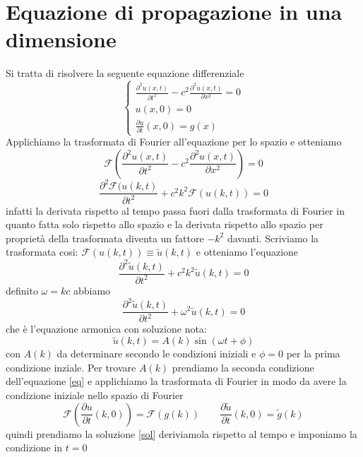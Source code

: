 \documentclass[12pt]{article}
\begin{document}
\newcommand{\R}{\mathbb{R}}
\newcommand{\C}{\mathbb{C}}
\newcommand{\Sum}{\sum_{n=0}^\infty}
\newtheorem{prop}{Proposizione}
\newtheorem{thm}{Teorema}[section]
\newtheorem{lem}[thm]{Lemma}
\theoremstyle{definition}
\newtheorem{dfn}{Definizione}
\theoremstyle{remark}
\newtheorem*{rmk}{Remark}
\renewcommand{\d}[2]{\frac{d #1}{d #2}} %
\newcommand{\dd}[2]{\frac{d^2 #1}{d #2^2}} %
\newcommand{\pd}[2]{\frac{\partial #1}{\partial #2}} 
\newcommand{\pdd}[2]{\frac{\partial^2 #1}{\partial #2^2}} 
\section{Equazione di propagazione in una dimensione}
Si tratta di risolvere la seguente equazione differenziale
\begin{equation}
\label{eq}
\begin{cases}
    \pdd{u(x,t)}{t}-c^2\pdd{u(x,t)}{x}=0  \\
   u(x,0) = 0\\
   \pd{u}{t}(x,0) = g(x)
  \end{cases} 
\end{equation}
Applichiamo la trasformata di Fourier all'equazione per lo spazio e otteniamo
\[\mathcal{F}\left(\pdd{u(x,t)}{t}-c^2\pdd{u(x,t)}{x}\right) = 0\]
\[\pdd{\mathcal{F}(u(k,t)}{t}+c^2k^2\mathcal{F}(u(k,t)) =0\]
infatti la derivata rispetto al tempo passa fuori dalla trasformata di Fourier in quanto fatta solo rispetto allo spazio e la derivata rispetto allo spazio per proprietà della trasformata diventa un fattore $-k^2$ davanti. Scriviamo la trasformata cosi: $\mathcal{F}(u(k,t)) \equiv \tilde{u}(k,t)$ e otteniamo l'equazione
\[\pdd{\tilde{u}(k,t)}{t}+c^2k^2\tilde{u}(k,t)=0\]
definito $\omega = kc$ abbiamo
\[\pdd{\tilde{u}(k,t)}{t}+\omega^2\tilde{u}(k,t)=0\]
che è l'equazione armonica con soluzione nota:
\begin{equation}
\label{sol}
\tilde{u}(k,t) = A(k)\sin(\omega t+\phi)
\end{equation}
con $A(k)$ da determinare secondo le condizioni iniziali e $\phi=0$ per la prima condizione inziale. Per trovare $A(k)$ prendiamo la seconda condizione dell'equazione \eqref{eq} e applichiamo la trasformata di Fourier in modo da avere la condizione iniziale nello spazio di Fourier
\[\mathcal{F}\left(\pd{u}{t}(k,0)\right) = \mathcal{F}(g(k)) \qquad \pd{\tilde{u}}{t}(k,0) = \tilde{g}(k)\]
quindi prendiamo la soluzione \eqref{sol} deriviamola rispetto al tempo e imponiamo la condizione in $t=0$
\end{document}
